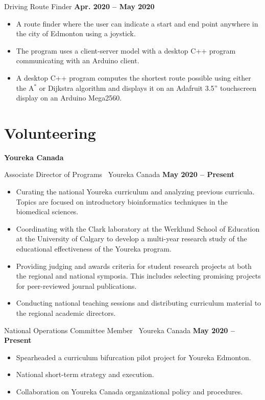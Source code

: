 \documentclass{article}
\begin{document}
    Driving Route Finder \hfill \textbf{Apr. 2020 -- May 2020}
    \begin{itemize}
        \item A route finder where the user can indicate a start and end point anywhere in the city of Edmonton using a joystick.
        \item The program uses a client-server model with a desktop C++ program communicating with an Arduino client.
        \item A desktop C++ program computes the shortest route possible using either the A$^*$ or Dijkstra algorithm and displays it on an Adafruit 3.5'' touchscreen display on an Arduino Mega2560.
    \end{itemize}


\section*{\textcolor{my_red}{Volunteering}}
    \textbf{Youreka Canada}

    Associate Director of Programs \textbar\ Youreka Canada \hfill \textbf{May 2020 -- Present}
    \begin{itemize}
        \item Curating the national Youreka curriculum and analyzing previous curricula. Topics are focused on introductory bioinformatics techniques in the biomedical sciences.
        \item Coordinating with the Clark laboratory at the Werklund School of Education at the University of Calgary to develop a multi-year research study of the educational effectiveness of the Youreka program.
        \item Providing judging and awards criteria for student research projects at both the regional and national symposia. This includes selecting promising projects for peer-reviewed journal publications.
        \item Conducting national teaching sessions and distributing curriculum material to the regional academic directors.
    \end{itemize}

    National Operations Committee Member \textbar\ Youreka Canada \hfill \textbf{May 2020 -- Present}
    \begin{itemize}
        \item Spearheaded a curriculum bifurcation pilot project for Youreka Edmonton.
        \item National short-term strategy and execution.
        \item Collaboration on Youreka Canada organizational policy and procedures.
    \end{itemize}
\end{document}
